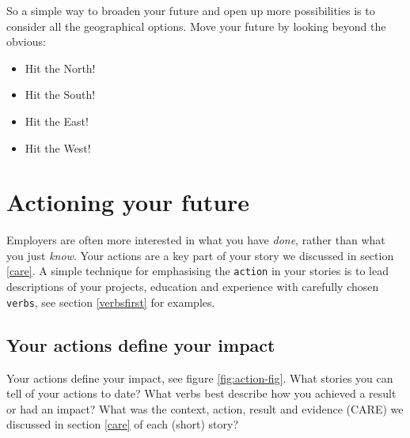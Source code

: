 \documentclass[
]{book}
\providecommand{\tightlist}{%
  \setlength{\itemsep}{0pt}\setlength{\parskip}{0pt}}
\begin{document}
So a simple way to broaden your future and open up more possibilities is to consider all the geographical options. Move your future by looking beyond the obvious:

\begin{itemize}
\tightlist
\item
  Hit the North!
\item
  Hit the South!
\item
  Hit the East!
\item
  Hit the West!
\end{itemize}

\hypertarget{actioning}{%
\chapter{Actioning your future}\label{actioning}}

Employers are often more interested in what you have \emph{done}, rather than what you just \emph{know}. Your actions are a key part of your story we discussed in section \ref{care}. A simple technique for emphasising the \texttt{action} in your stories is to lead descriptions of your projects, education and experience with carefully chosen \texttt{verbs}, see section \ref{verbsfirst} for examples.

\hypertarget{impact}{%
\section{Your actions define your impact}\label{impact}}

Your actions define your impact, see figure \ref{fig:action-fig}. What stories you can tell of your actions to date? What verbs best describe how you achieved a result or had an impact? What was the context, action, result and evidence (CARE) we discussed in section \ref{care} of each (short) story?
\end{document}

